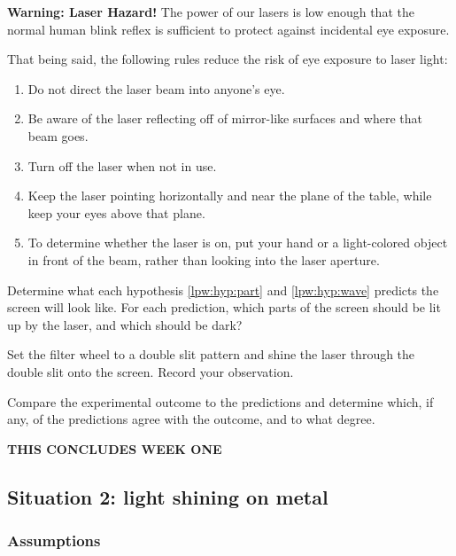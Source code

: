 \begin{framed}
	\textbf{Warning: Laser Hazard!} The power of our lasers is low enough that the normal human blink reflex is sufficient to protect against incidental eye exposure.
	
	That being said, the following rules reduce the risk of eye exposure to laser light:
	\begin{enumerate}
		\item Do not direct the laser beam into anyone's eye.
		\item Be aware of the laser reflecting off of mirror-like surfaces and where that beam goes.
		\item Turn off the laser when not in use.
		\item Keep the laser pointing horizontally and near the plane of the table, while keep your eyes above that plane.
		\item To determine whether the laser is on, put your hand or a light-colored object in front of the beam, rather than looking into the laser aperture.
	\end{enumerate}
\end{framed}

\begin{steps}
	\item Determine what each hypothesis \ref{lpw:hyp:part} and \ref{lpw:hyp:wave} predicts the screen will look like. For each prediction, which parts of the screen should be lit up by the laser, and which should be dark?
	
	\item Set the filter wheel to a double slit pattern and shine the laser through the double slit onto the screen. Record your observation.
	
	\item Compare the experimental outcome to the predictions and determine which, if any, of the predictions agree with the outcome, and to what degree.
\end{steps}

\begin{framed}
	\centering
	\textbf{THIS CONCLUDES WEEK ONE}
\end{framed}

\subsection{Situation 2: light shining on metal}

\subsubsection{Assumptions}

